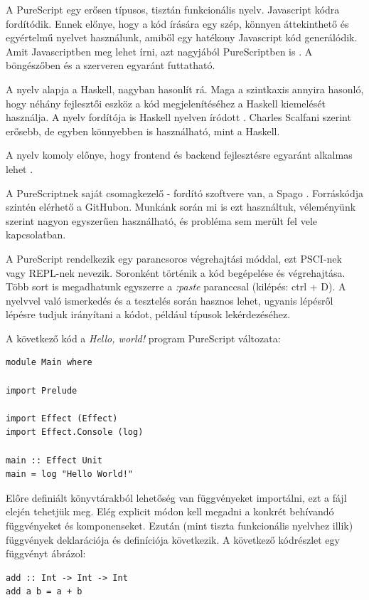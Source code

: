 \documentclass[12pt]{article}
\begin{document}
A PureScript egy erősen típusos, tisztán funkcionális nyelv. Javascript kódra fordítódik. Ennek előnye, hogy a kód írására egy szép, könnyen áttekinthető és egyértelmű nyelvet használunk, amiből egy hatékony Javascript kód generálódik. Amit Javascriptben meg lehet írni, azt nagyjából PureScriptben is \cite{CS}. A böngészőben és  a szerveren egyaránt futtatható.

A nyelv alapja a Haskell, nagyban hasonlít rá. Maga a szintkaxis annyira hasonló, hogy néhány fejlesztői eszköz a kód megjelenítéséhez a Haskell kiemelését használja. A nyelv fordítója is Haskell nyelven íródott \cite{CS}. Charles Scalfani \cite{CS} szerint erősebb, de egyben könnyebben is használható, mint a Haskell.

A nyelv komoly előnye, hogy frontend és backend fejlesztésre egyaránt alkalmas lehet \cite{CS}.

A PureScriptnek saját csomagkezelő - fordító szoftvere van, a Spago \cite{spago}. Forráskódja szintén elérhető a GitHubon. Munkánk során mi is ezt használtuk, véleményünk szerint nagyon egyszerűen használható, és probléma sem merült fel vele kapcsolatban.

A PureScript rendelkezik egy parancsoros végrehajtási móddal,  ezt PSCI-nek vagy REPL-nek nevezik.  Soronként történik a kód begépelése és végrehajtása. Több sort is megadhatunk egyszerre a \textit{:paste} paranccsal (kilépés: ctrl + D).  A nyelvvel való ismerkedés és a tesztelés során hasznos lehet,  ugyanis lépésről lépésre tudjuk irányítani a kódot,  például típusok lekérdezéséhez. 

A következő kód a  \textit{Hello,  world!} program PureScript változata:

\begin{verbatim}
module Main where

import Prelude

import Effect (Effect)
import Effect.Console (log)

main :: Effect Unit
main = log "Hello World!"
\end{verbatim}

Előre definiált könyvtárakból lehetőség van függvényeket importálni,  ezt a fájl elején tehetjük meg.  Elég explicit módon kell megadni a konkrét behívandó függvényeket és komponenseket.  Ezután (mint tiszta funkcionális nyelvhez illik) függvények deklarációja és definíciója következik.  A következő kódrészlet egy függvényt ábrázol:

\begin{verbatim}
add :: Int -> Int -> Int
add a b = a + b
\end{verbatim}
\end{document}
